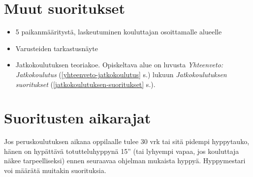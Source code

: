 \section{ Muut suoritukset }
\label{yhteenveto-peruskoulutus-muut-suoritukset}

\begin{itemize}
\item  5 paikanmääritystä, laskeutuminen kouluttajan osoittamalle alueelle  
\item  Varusteiden tarkastusnäyte 
\item  Jatkokoulutuksen teoriakoe. Opiskeltava alue on luvusta \textit{Yhteenveto: Jatkokoulutus} (\ref{yhteenveto-jatkokoulutus} s.\pageref{yhteenveto-jatkokoulutus}) lukuun \textit{Jatkokoulutuksen suoritukset} (\ref{jatkokoulutuksen-suoritukset} s.\pageref{jatkokoulutuksen-suoritukset}). 
\end{itemize}
\section{ Suoritusten aikarajat }
\label{yhteenveto-peruskoulutus-suoritusten-aikarajat}


Jos peruskoulutuksen aikana oppilaalle tulee 30 vrk tai sitä pidempi hyppytauko, hänen on hypättävä totutteluhyppynä 15'' (tai lyhyempi vapaa, jos kouluttaja näkee tarpeelliseksi) ennen seuraavaa ohjelman mukaista hyppyä. Hyppymestari voi määrätä muitakin suorituksia. 

